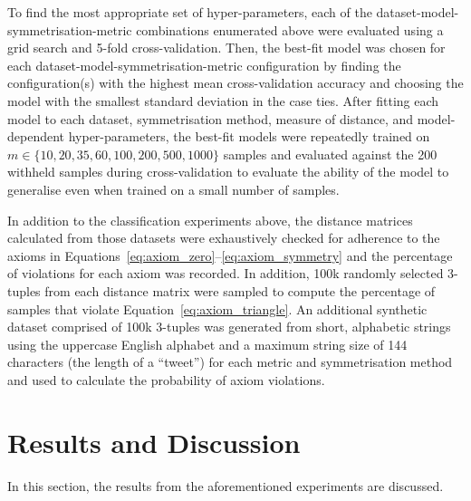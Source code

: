 \documentclass[preprint,12pt]{article}
\begin{document}
To find the most appropriate set of hyper-parameters, each of the dataset-model-symmetrisation-metric combinations enumerated above were evaluated using a grid search and 5-fold cross-validation.
Then, the best-fit model was chosen for each dataset-model-symmetrisation-metric configuration by finding the configuration(s) with the highest mean cross-validation accuracy and choosing the model with the smallest standard deviation in the case ties.
After fitting each model to each dataset, symmetrisation method, measure of distance, and model-dependent hyper-parameters, the best-fit models were repeatedly trained on $m \in \{10, 20, 35, 60, 100, 200, 500, 1000\}$ samples and evaluated against the 200 withheld samples during cross-validation to evaluate the ability of the model to generalise even when trained on a small number of samples.

In addition to the classification experiments above, the distance matrices calculated from those datasets were exhaustively checked for adherence to the axioms in Equations~\ref{eq:axiom_zero}--\ref{eq:axiom_symmetry} and the percentage of violations for each axiom was recorded. 
In addition, 100k randomly selected 3-tuples from each distance matrix were sampled to compute the percentage of samples that violate Equation~\ref{eq:axiom_triangle}. 
An additional synthetic dataset comprised of 100k 3-tuples was generated from short, alphabetic strings using the uppercase English alphabet and a maximum string size of 144 characters (the length of a ``tweet'') for each metric and symmetrisation method and used to calculate the probability of axiom violations.


\section{Results and Discussion}
\label{results}

In this section, the results from the aforementioned experiments are discussed. 
\end{document}
